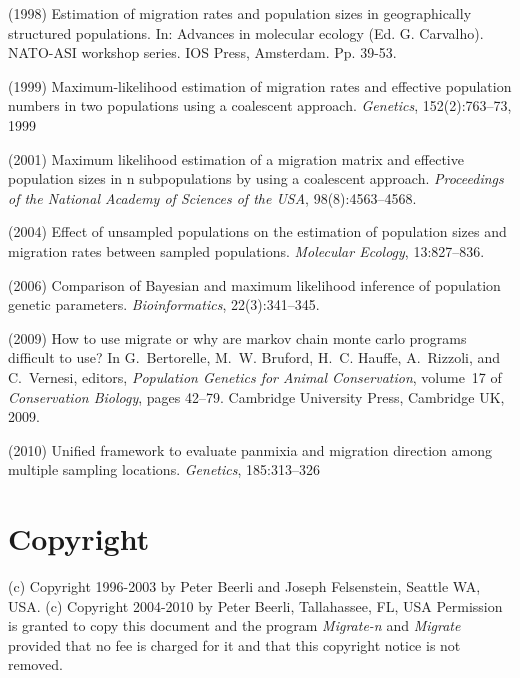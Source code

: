 \begin{description}
 (1998)
Estimation of migration rates and population sizes in geographically
structured populations. 
In: Advances in molecular ecology (Ed. G. Carvalho). NATO-ASI workshop series. IOS Press, Amsterdam. Pp. 39-53. 

 (1999)
Maximum-likelihood estimation of migration rates and effective
  population numbers in two populations using a coalescent approach.
{\em Genetics}, 152(2):763--73, 1999


 (2001)
Maximum likelihood estimation of a migration matrix and effective
  population sizes in n subpopulations by using a coalescent approach.
{\em Proceedings of the National Academy of Sciences of the USA},
  98(8):4563--4568.

 (2004)
Effect of unsampled populations on the estimation of population sizes
  and migration rates between sampled populations.
 {\em Molecular Ecology}, 13:827--836.

 (2006)
Comparison of {B}ayesian and maximum likelihood inference of
  population genetic parameters.
{\em Bioinformatics}, 22(3):341--345.

 (2009)
How to use migrate or why are markov chain monte carlo programs
  difficult to use? In G.~Bertorelle, M.~W. Bruford, H.~C. Hauffe, A.~Rizzoli, and
  C.~Vernesi, editors, {\em Population Genetics for Animal Conservation},
  volume~17 of {\em Conservation Biology}, pages 42--79. Cambridge University
  Press, Cambridge UK, 2009.

(2010)
Unified framework to evaluate panmixia and migration direction among multiple sampling locations.
{\em Genetics}, 185:313--326

\end{description}


\section{Copyright}
(c) Copyright 1996-2003 by Peter Beerli and Joseph Felsenstein, Seattle WA, USA. 
(c) Copyright 2004-2010 by Peter Beerli, Tallahassee, FL, USA
Permission is granted to copy this document and the program {\it Migrate-n}
and {\it Migrate} 
provided that no fee is charged for it and that this copyright notice is not removed.                               
 
